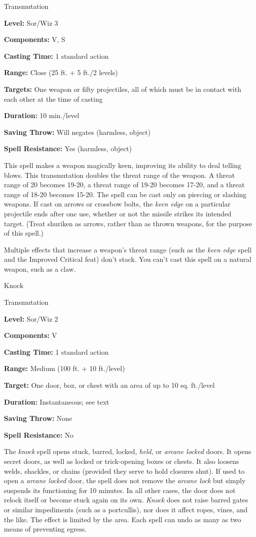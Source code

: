 \documentclass{article}
\begin{document}
Transmutation

\textbf{Level:} Sor/Wiz 3

\textbf{Components:} V, S

\textbf{Casting Time:} 1 standard action

\textbf{Range:} Close (25 ft. + 5 ft./2 levels)

\textbf{Targets:} One weapon or fifty projectiles, all of which must be in contact 
with each other at the time of casting

\textbf{Duration:} 10 min./level

\textbf{Saving Throw: }Will negates (harmless, object)

\textbf{Spell Resistance:} Yes (harmless, object)

This spell makes a weapon magically keen, improving its ability to deal telling 
blows. This transmutation doubles the threat range of the weapon. A threat range 
of 20 becomes 19-20, a threat range of 19-20 becomes 17-20, and a threat range 
of 18-20 becomes 15-20. The spell can be cast only on piercing or slashing weapons. 
If cast on arrows or crossbow bolts, the \textit{keen edge }on a particular projectile 
ends after one use, whether or not the missile strikes its intended target. (Treat 
shuriken as arrows, rather than as thrown weapons, for the purpose of this spell.)

Multiple effects that increase a weapon's threat range (such as the \textit{keen 
edge }spell and the Improved Critical feat) don't stack. You can't cast this spell 
on a natural weapon, such as a claw.

\vspace{12pt}
Knock

Transmutation

\textbf{Level:} Sor/Wiz 2

\textbf{Components:} V

\textbf{Casting Time:} 1 standard action

\textbf{Range: }Medium (100 ft. + 10 ft./level)

\textbf{Target:} One door, box, or chest with an area of up to 10 sq. ft./level

\textbf{Duration:} Instantaneous; see text

\textbf{Saving Throw:} None

\textbf{Spell Resistance:} No

The \textit{knock }spell opens stuck, barred, locked, \textit{held, }or \textit{arcane 
locked }doors. It opens secret doors, as well as locked or trick-opening boxes 
or chests. It also loosens welds, shackles, or chains (provided they serve to hold 
closures shut). If used to open a \textit{arcane locked }door, the spell does not 
remove the \textit{arcane lock }but simply suspends its functioning for 10 minutes. 
In all other cases, the door does not relock itself or become stuck again on its 
own. \textit{Knock }does not raise barred gates or similar impediments (such as 
a portcullis), nor does it affect ropes, vines, and the like. The effect is limited 
by the area. Each spell can undo as many as two means of preventing egress. 
\end{document}

